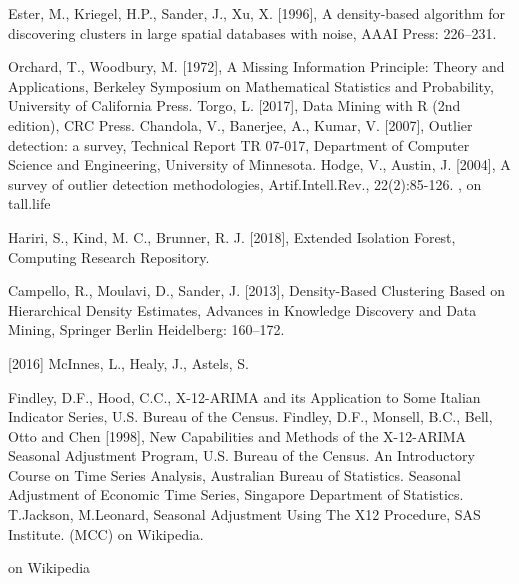 \begin{thebibliography}{99}
 Ester, M., Kriegel, H.P., Sander, J., Xu, X. [1996], A density-based algorithm for discovering clusters in large spatial databases with noise, AAAI Press: 226--231.

 Orchard, T., Woodbury, M. [1972], A Missing Information Principle: Theory and Applications, Berkeley Symposium on Mathematical Statistics and Probability, University of California Press.  
 Torgo, L. [2017], Data Mining with R (2nd edition), CRC Press.
 Chandola, V., Banerjee, A., Kumar, V. [2007], Outlier detection: a survey, Technical Report TR 07-017, Department of Computer Science and Engineering, University of Minnesota.
 Hodge, V., Austin, J. [2004], A survey of outlier detection methodologies, Artif.Intell.Rev., 22(2):85-126.
 , on tall.life 

 Hariri, S., Kind, M. C., Brunner, R. J. [2018], Extended Isolation Forest, Computing Research Repository.

 Campello, R., Moulavi, D., Sander, J. [2013], Density-Based Clustering Based on Hierarchical Density Estimates, Advances in Knowledge Discovery and Data Mining, Springer Berlin Heidelberg: 160--172.

  [2016] McInnes, L., Healy, J., Astels, S.

 Findley, D.F., Hood, C.C., X-12-ARIMA and its Application to Some Italian Indicator Series,  U.S. Bureau of the Census.
 Findley, D.F., Monsell, B.C., Bell, Otto and Chen [1998], New Capabilities and Methods of the X-12-ARIMA Seasonal Adjustment Program, U.S. Bureau of the Census. 
 An Introductory Course on Time Series Analysis, Australian Bureau of Statistics. 
 Seasonal Adjustment of Economic Time Series, Singapore Department of Statistics.
 T.Jackson, M.Leonard, Seasonal Adjustment Using The X12 Procedure, SAS Institute.
  (MCC) on Wikipedia.

 on Wikipedia


\end{thebibliography}

